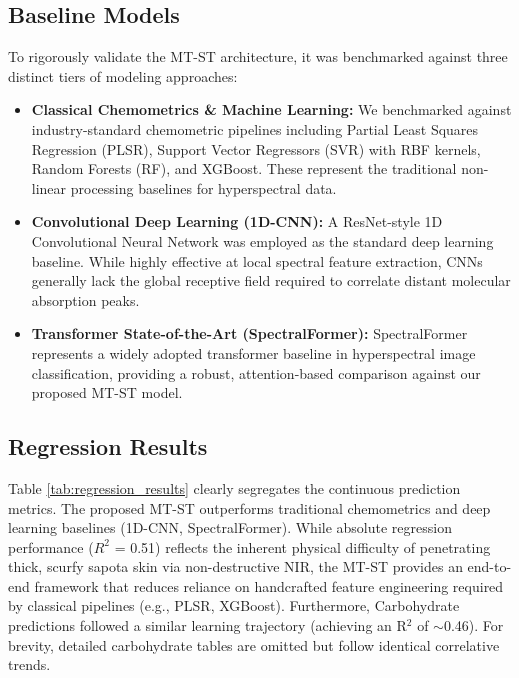 \documentclass[pdflatex,sn-mathphys-num]{sn-jnl}
\begin{document}
\subsection{Baseline Models}
To rigorously validate the MT-ST architecture, it was benchmarked against three distinct tiers of modeling approaches:
\begin{itemize}
    \item \textbf{Classical Chemometrics \& Machine Learning:} We benchmarked against industry-standard chemometric pipelines including Partial Least Squares Regression (PLSR), Support Vector Regressors (SVR) with RBF kernels, Random Forests (RF), and XGBoost. These represent the traditional non-linear processing baselines for hyperspectral data.
    \item \textbf{Convolutional Deep Learning (1D-CNN):} A ResNet-style 1D Convolutional Neural Network was employed as the standard deep learning baseline. While highly effective at local spectral feature extraction, CNNs generally lack the global receptive field required to correlate distant molecular absorption peaks.
    \item \textbf{Transformer State-of-the-Art (SpectralFormer):} SpectralFormer \cite{hong2021spectralformer} represents a widely adopted transformer baseline in hyperspectral image classification, providing a robust, attention-based comparison against our proposed MT-ST model.
\end{itemize}

\subsection{Regression Results}

Table \ref{tab:regression_results} clearly segregates the continuous prediction metrics. The proposed MT-ST outperforms traditional chemometrics and deep learning baselines (1D-CNN, SpectralFormer). While absolute regression performance ($R^2$ = 0.51) reflects the inherent physical difficulty of penetrating thick, scurfy sapota skin via non-destructive NIR, the MT-ST provides an end-to-end framework that reduces reliance on handcrafted feature engineering required by classical pipelines (e.g., PLSR, XGBoost). Furthermore, Carbohydrate predictions followed a similar learning trajectory (achieving an R$^2$ of $\sim$0.46). For brevity, detailed carbohydrate tables are omitted but follow identical correlative trends.
\end{document}
